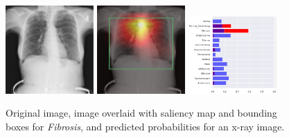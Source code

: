 \documentclass[12pt,oneside,a4paper]{report}
\begin{document}
\begin{figure}[H]
  \centering
  \includegraphics[width=0.3\textwidth]{images/preds/fibrosis}\hspace{0.01\textwidth}%
  \includegraphics[width=0.3\textwidth]{images/preds/fibrosis_cam}\hspace{0.01\textwidth}%
  \includegraphics[width=0.3\textwidth]{images/preds/fibrosis_probs}\\[0.01\textwidth]
  \caption{Original image, image overlaid with saliency map and bounding boxes
    for \emph{Fibrosis}, and predicted probabilities for an x-ray image.}
  \label{examples_12}
\end{figure}
\end{document}
